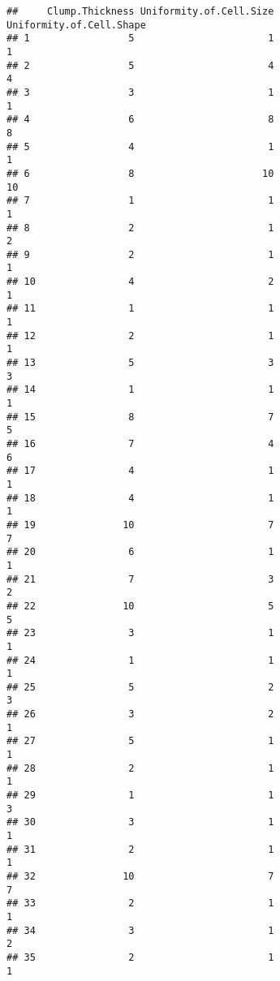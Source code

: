 \documentclass[
]{article}
\begin{document}
\begin{verbatim}
##     Clump.Thickness Uniformity.of.Cell.Size Uniformity.of.Cell.Shape
## 1                 5                       1                        1
## 2                 5                       4                        4
## 3                 3                       1                        1
## 4                 6                       8                        8
## 5                 4                       1                        1
## 6                 8                      10                       10
## 7                 1                       1                        1
## 8                 2                       1                        2
## 9                 2                       1                        1
## 10                4                       2                        1
## 11                1                       1                        1
## 12                2                       1                        1
## 13                5                       3                        3
## 14                1                       1                        1
## 15                8                       7                        5
## 16                7                       4                        6
## 17                4                       1                        1
## 18                4                       1                        1
## 19               10                       7                        7
## 20                6                       1                        1
## 21                7                       3                        2
## 22               10                       5                        5
## 23                3                       1                        1
## 24                1                       1                        1
## 25                5                       2                        3
## 26                3                       2                        1
## 27                5                       1                        1
## 28                2                       1                        1
## 29                1                       1                        3
## 30                3                       1                        1
## 31                2                       1                        1
## 32               10                       7                        7
## 33                2                       1                        1
## 34                3                       1                        2
## 35                2                       1                        1

\end{verbatim}
\end{document}
